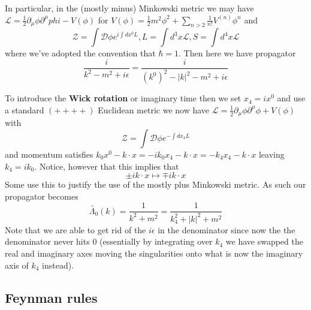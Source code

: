 \documentclass{article}
\theoremstyle{definition}
\begin{document}
In particular, in the (mostly minus) Minkowski metric we may have $\mathcal{L} =
\frac{1}{2} \partial_\mu \phi \partial^\mu phi - V(\phi)$ for $V(\phi) =
\frac{1}{2} m^2 \phi^2 + \sum_{n > 2} \frac{1}{n!} V^{(n)} \phi^n$ and
\begin{equation}
\mathcal{Z} = \int \mathcal{D}\phi e^{i \int dx^0 L}, L = \int d^3x \mathcal{L}, 
S = \int d^4x \mathcal{L}
\end{equation}
where we've adopted the convention that $\hbar = 1$. Then here we have
propagator
\begin{equation}
\frac{i}{k^2 - m^2 + i\epsilon} = \frac{i}{(k^0)^2 - |k|^2 - m^2 + i\epsilon}
\end{equation}

To introduce the \textbf{Wick rotation} or imaginary time then we set $x_4 =
ix^0$ and use a standard $(++++)$ Euclidean metric we now have $\mathcal{L} =
\frac{1}{2} \partial_\mu \phi \partial^\mu \phi + V(\phi)$ with
\begin{equation}
\mathcal{Z} = \int \mathcal{D} \phi e^{-\int dx_4 L}
\end{equation}
and momentum satisfies $k_0 x^0 - k \cdot x = -ik_0 x_4 - k \cdot x = -k_4 x_4 -
k \cdot x$ leaving $k_4 = ik_0$. Notice, however that this implies that
\begin{equation}
\pm ik \cdot x \mapsto \mp ik \cdot x
\end{equation}
Some use this to justify the use of the mostly plus Minkowski metric. As such
our propagator becomes
\begin{equation}
\tilde{\Lambda_0}(k) = \frac{1}{k^2 + m^2} = \frac{1}{k_4^2 + |k|^2 + m^2}
\end{equation}
Note that we are able to get rid of the $i\epsilon$ in the denominator since now
the the denominator never hits 0 (essentially by integrating over $k_4$ we have
swapped the real and imaginary axes moving the singularities onto what is now
the imaginary axis of $k_4$ instead). 

\subsection{Feynman rules}
\end{document}
